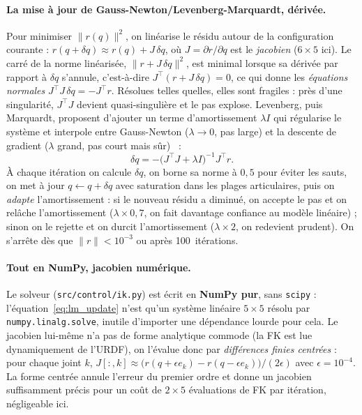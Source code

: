 \paragraph{La mise à jour de Gauss-Newton/Levenberg-Marquardt, dérivée.} Pour
minimiser $\|r(q)\|^2$, on linéarise le résidu autour de la configuration
courante : $r(q + \delta q) \approx r(q) + J\,\delta q$, où $J = \partial r /
\partial q$ est le \emph{jacobien} ($6\times5$ ici). Le carré de la norme
linéarisée, $\|r + J\,\delta q\|^2$, est minimal lorsque sa dérivée par rapport à
$\delta q$ s'annule, c'est-à-dire $J^\top(r + J\,\delta q) = 0$, ce qui donne les
\emph{équations normales} $J^\top J\,\delta q = -J^\top r$. Résolues telles
quelles, elles sont fragiles : près d'une singularité, $J^\top J$ devient
quasi-singulière et le pas explose. Levenberg, puis Marquardt, proposent
d'ajouter un terme d'amortissement $\lambda I$ qui régularise le système et
interpole entre Gauss-Newton ($\lambda \to 0$, pas large) et la descente de
gradient ($\lambda$ grand, pas court mais sûr)~\cite{marquardt_algorithm_1963} :
\begin{equation}
  \delta q = -\bigl(J^\top J + \lambda I\bigr)^{-1} J^\top r.
  \label{eq:lm_update}
\end{equation}
À chaque itération on calcule $\delta q$, on borne sa norme à $0{,}5$ pour éviter
les sauts, on met à jour $q \leftarrow q + \delta q$ avec saturation dans les
plages articulaires, puis on \emph{adapte} l'amortissement : si le nouveau résidu
a diminué, on accepte le pas et on relâche l'amortissement ($\lambda \times 0{,}7$,
on fait davantage confiance au modèle linéaire) ; sinon on le rejette et on
durcit l'amortissement ($\lambda \times 2$, on redevient prudent). On s'arrête
dès que $\|r\| < 10^{-3}$ ou après 100~itérations.

\paragraph{Tout en NumPy, jacobien numérique.} Le solveur (\texttt{src/control/ik.py})
est écrit en \textbf{NumPy pur}, sans \texttt{scipy} : l'équation~\eqref{eq:lm_update}
n'est qu'un système linéaire $5\times5$ résolu par \texttt{numpy.linalg.solve},
inutile d'importer une dépendance lourde pour cela. Le jacobien lui-même n'a pas
de forme analytique commode (la FK est lue dynamiquement de l'URDF), on l'évalue
donc par \emph{différences finies centrées} : pour chaque joint $k$, $J[:,k]
\approx \bigl(r(q + \epsilon e_k) - r(q - \epsilon e_k)\bigr)/(2\epsilon)$ avec
$\epsilon = 10^{-4}$. La forme centrée annule l'erreur du premier ordre et donne
un jacobien suffisamment précis pour un coût de $2\times5$ évaluations de FK par
itération, négligeable ici.


